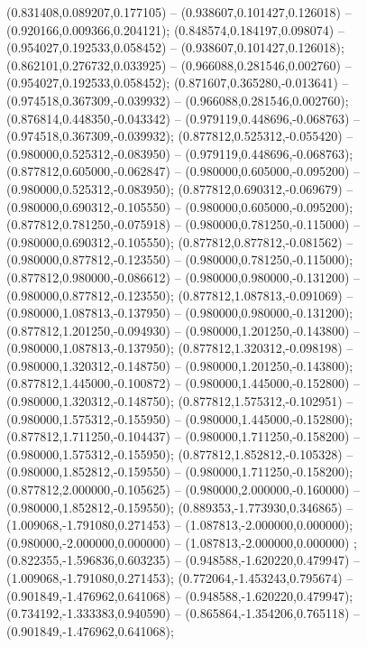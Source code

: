  (0.831408,0.089207,0.177105) -- (0.938607,0.101427,0.126018) -- (0.920166,0.009366,0.204121);
 (0.848574,0.184197,0.098074) -- (0.954027,0.192533,0.058452) -- (0.938607,0.101427,0.126018);
 (0.862101,0.276732,0.033925) -- (0.966088,0.281546,0.002760) -- (0.954027,0.192533,0.058452);
 (0.871607,0.365280,-0.013641) -- (0.974518,0.367309,-0.039932) -- (0.966088,0.281546,0.002760);
 (0.876814,0.448350,-0.043342) -- (0.979119,0.448696,-0.068763) -- (0.974518,0.367309,-0.039932);
 (0.877812,0.525312,-0.055420) -- (0.980000,0.525312,-0.083950) -- (0.979119,0.448696,-0.068763);
 (0.877812,0.605000,-0.062847) -- (0.980000,0.605000,-0.095200) -- (0.980000,0.525312,-0.083950);
 (0.877812,0.690312,-0.069679) -- (0.980000,0.690312,-0.105550) -- (0.980000,0.605000,-0.095200);
 (0.877812,0.781250,-0.075918) -- (0.980000,0.781250,-0.115000) -- (0.980000,0.690312,-0.105550);
 (0.877812,0.877812,-0.081562) -- (0.980000,0.877812,-0.123550) -- (0.980000,0.781250,-0.115000);
 (0.877812,0.980000,-0.086612) -- (0.980000,0.980000,-0.131200) -- (0.980000,0.877812,-0.123550);
 (0.877812,1.087813,-0.091069) -- (0.980000,1.087813,-0.137950) -- (0.980000,0.980000,-0.131200);
 (0.877812,1.201250,-0.094930) -- (0.980000,1.201250,-0.143800) -- (0.980000,1.087813,-0.137950);
 (0.877812,1.320312,-0.098198) -- (0.980000,1.320312,-0.148750) -- (0.980000,1.201250,-0.143800);
 (0.877812,1.445000,-0.100872) -- (0.980000,1.445000,-0.152800) -- (0.980000,1.320312,-0.148750);
 (0.877812,1.575312,-0.102951) -- (0.980000,1.575312,-0.155950) -- (0.980000,1.445000,-0.152800);
 (0.877812,1.711250,-0.104437) -- (0.980000,1.711250,-0.158200) -- (0.980000,1.575312,-0.155950);
 (0.877812,1.852812,-0.105328) -- (0.980000,1.852812,-0.159550) -- (0.980000,1.711250,-0.158200);
 (0.877812,2.000000,-0.105625) -- (0.980000,2.000000,-0.160000) -- (0.980000,1.852812,-0.159550);
 (0.889353,-1.773930,0.346865) -- (1.009068,-1.791080,0.271453) -- (1.087813,-2.000000,0.000000);
 (0.980000,-2.000000,0.000000) -- (1.087813,-2.000000,0.000000) ;
 (0.822355,-1.596836,0.603235) -- (0.948588,-1.620220,0.479947) -- (1.009068,-1.791080,0.271453);
 (0.772064,-1.453243,0.795674) -- (0.901849,-1.476962,0.641068) -- (0.948588,-1.620220,0.479947);
 (0.734192,-1.333383,0.940590) -- (0.865864,-1.354206,0.765118) -- (0.901849,-1.476962,0.641068);

